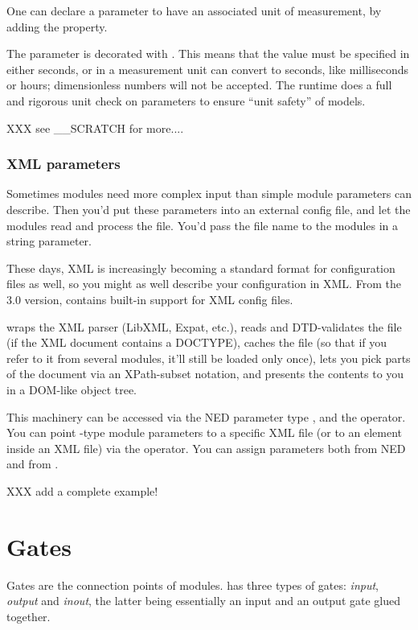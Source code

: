 One can declare a parameter to have an associated unit of measurement,
by adding the  property.

The  parameter is decorated with . This means
that the value must be specified in either seconds, or in a measurement unit {\opp}
can convert to seconds, like milliseconds or hours; dimensionless numbers
will not be accepted. The {\opp} runtime does a full and rigorous unit check on
parameters to ensure ``unit safety'' of models.

XXX see \_\_SCRATCH for more....


\subsubsection{XML parameters}

Sometimes modules need more complex input than simple module parameters
can describe. Then you'd put these parameters into an external config file,
and let the modules read and process the file. You'd pass the file name
to the modules in a string parameter.

These days, XML is increasingly becoming a standard format for configuration
files as well, so you might as well describe your configuration in XML.
From the 3.0 version, {\opp} contains built-in support for XML config files.

{\opp} wraps the XML parser (LibXML, Expat, etc.), reads and DTD-validates
the file (if the XML document contains a DOCTYPE), caches the file
(so that if you refer to it from several modules, it'll still be loaded
only once), lets you pick parts of the document via an XPath-subset notation,
and presents the contents to you in a DOM-like object tree.

This machinery can be accessed via the NED parameter type , and the
 operator. You can point -type module parameters
to a specific XML file (or to an element inside an XML file) via the
 operator. You can assign  parameters both from NED
and from .

XXX add a complete example!


\section{Gates}

Gates are the connection points of modules.  {\opp} has three types of
gates: \textit{input}, \textit{output} and \textit{inout}, the latter being
essentially an input and an output gate glued together.


